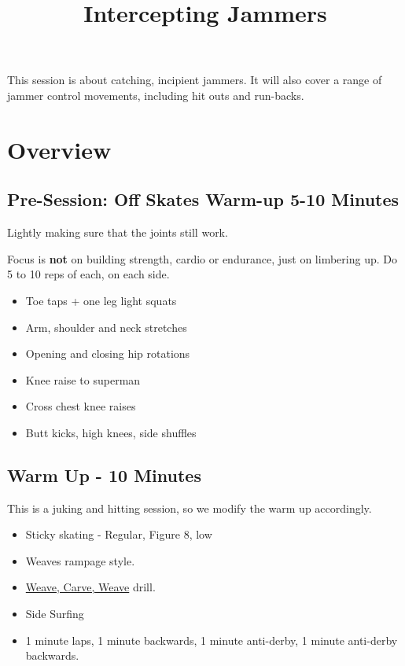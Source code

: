\documentclass{journal}
\title{Intercepting Jammers}
\author{}
\begin{document}
\maketitle
\noindent 

This session is about catching, incipient jammers.
It will also cover a range of jammer control movements, including hit outs and run-backs.

\section*{Overview}

\subsection*{Pre-Session: Off Skates Warm-up 5-10 Minutes}
Lightly making sure that the joints still work.

Focus is {\bf not} on building strength, cardio or endurance, just on limbering up. Do 5 to 10 reps of each, on each side. 

\begin{itemize}
\item Toe taps + one leg light squats
\item Arm, shoulder and neck stretches
\item Opening and closing hip rotations
\item Knee raise to superman 
\item Cross chest knee raises
\item Butt kicks, high knees, side shuffles
\end{itemize}


\subsection*{Warm Up - 10 Minutes}

This is a juking and hitting session, so we modify the warm up accordingly.

\begin{itemize}
\item Sticky skating - Regular, Figure 8, low
\item Weaves rampage style. 
\item \hyperref[drill:footwork/weave_carve_weave]{Weave, Carve, Weave} drill.
\item Side Surfing 
\item 1 minute laps, 1 minute backwards, 1 minute anti-derby, 1 minute anti-derby backwards.  
\end{itemize}
\end{document}
